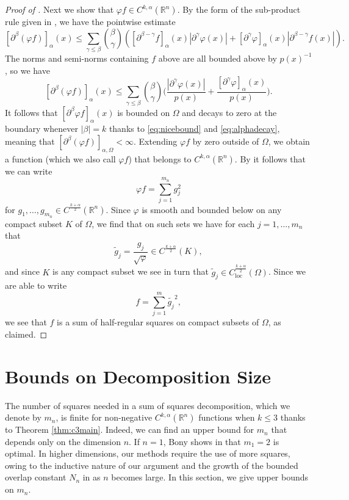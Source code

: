 \documentclass[oneside,hidelinks,indentfirst,10pt]{book}
\begin{document}
\begin{proof}[Proof of ]
Next we show that \(\varphi f\in C^{k,\alpha}(\mathbb{R}^n)\). By the form of the sub-product rule given in , we have the pointwise estimate
\[
    [\partial^\beta(\varphi f)]_\alpha(x)\leq \sum_{\gamma\leq\beta }\binom{\beta}{\gamma}([\partial^{\beta-\gamma} f]_\alpha(x)|\partial^\gamma\varphi(x)|+[\partial^\gamma \varphi]_\alpha(x)|\partial^{\beta-\gamma}f(x)|).
\]
The norms and semi-norms containing \(f\) above are all bounded above by \(p(x)^{-1}\), so we have
\[
    [\partial^\beta(\varphi f)]_\alpha(x)\leq \sum_{\gamma\leq\beta}\binom{\beta}{\gamma}\bigg(\frac{|\partial^\gamma\varphi(x)|}{p(x)}+\frac{[\partial^\gamma \varphi]_\alpha(x)}{p(x)}\bigg).
\]
It follows that \([\partial^\beta\varphi f]_\alpha(x)\) is bounded on \(\Omega\) and decays to zero at the boundary whenever \(|\beta|=k\) thanks to \eqref{eq:nicebound} and \eqref{eq:alphadecay}, meaning that \([\partial^\beta(\varphi f)]_{\alpha,\Omega}<\infty\). Extending \(\varphi f\) by zero outside of \(\Omega\), we obtain a function (which we also call \(\varphi f\)) that belongs to \(C^{k,\alpha}(\mathbb{R}^n)\). By  it follows that we can write
\[
    \varphi f=\sum_{j=1}^{m_n} g_j^2
\] 
for \(g_1,\dots,g_{m_n}\in C^\frac{k+\alpha}{2}(\mathbb{R}^n)\). Since \(\varphi\) is smooth and bounded below on any compact subset \(K\) of \(\Omega\), we find that on such sets we have for each \(j=1,\dots,m_n\) that
\[
    \tilde{g}_j=\frac{g_j}{\sqrt{\varphi}}\in C^\frac{k+\alpha}{2}(K),
\]
and since \(K\) is any compact subset we see in turn that \(\tilde{g}_j\in C^\frac{k+\alpha}{2}_{\mathrm{loc}}(\Omega)\). Since we are able to write
\[
    f=\sum_{j=1}^m \tilde{g_j}^2,
\]
we see that \(f\) is a sum of half-regular squares on compact subsets of \(\Omega\), as claimed.
\end{proof}


\section{Bounds on Decomposition Size}\label{sec:sizebounds}


The number of squares needed in a sum of squares decomposition, which we denote by \(m_n\), is finite for non-negative \(C^{k,\alpha}(\mathbb{R}^n)\) functions when \(k\leq 3\) thanks to Theorem \ref{thm:c3main}. Indeed, we can find an upper bound for \(m_n\) that depends only on the dimension \(n\). If \(n=1\), Bony shows in \cite{Bony2} that \(m_1=2\) is optimal. In higher dimensions, our methods require the use of more squares, owing to the inductive nature of our argument and the growth of the bounded overlap constant \(N_n\) in  as \(n\) becomes large. In this section, we give upper bounds on \(m_n\).
\end{document}
